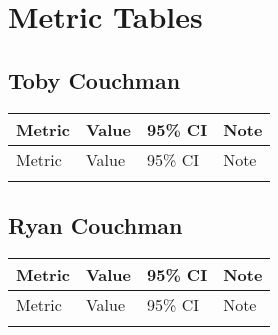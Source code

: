 \section{Metric Tables}

\subsection{Toby Couchman}
\begin{longtable}{L{3.6cm} C{2.3cm} C{3.6cm} L{5.5cm}}
\toprule
Metric & Value & 95\% CI & Note\\
\midrule
\endfirsthead
\toprule
Metric & Value & 95\% CI & Note\\
\midrule
\endhead
\bottomrule
\endfoot
\bottomrule
\endlastfoot

\end{longtable}

\subsection{Ryan Couchman}
\begin{longtable}{L{3.6cm} C{2.3cm} C{3.6cm} L{5.5cm}}
\toprule
Metric & Value & 95\% CI & Note\\
\midrule
\endfirsthead
\toprule
Metric & Value & 95\% CI & Note\\
\midrule
\endhead
\bottomrule
\endfoot
\bottomrule
\endlastfoot

\end{longtable}
